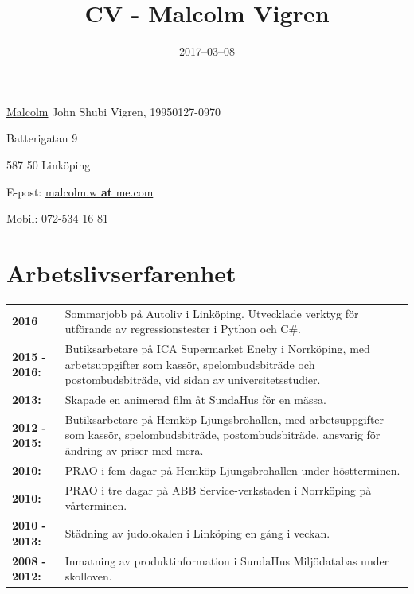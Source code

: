 \documentclass[a4paper,notitlepage]{article}
\title{
\huge{CV - Malcolm Vigren}\vspace{-3ex}}
\date{2017--03--08}
\begin{document}
	\maketitle
\underline{Malcolm} John Shubi Vigren, 19950127-0970

Batterigatan 9

587 50 Linköping

E-post: \underline{malcolm.w \textbf{at} me.com}

Mobil: 072-534 16 81

\section*{Arbetslivserfarenhet}
\noindent\begin{tabular}{@{}l p{13cm}}

\textbf{2016} & Sommarjobb på Autoliv i Linköping. Utvecklade verktyg för
    utförande av regressionstester i Python och C\#.\\

\textbf{2015 - 2016:} & Butiksarbetare på ICA Supermarket Eneby i Norrköping, med
arbetsuppgifter som kassör, spelombudsbiträde och postombudsbiträde, vid sidan
av universitetsstudier. \\

\textbf{2013:} & Skapade en animerad film åt SundaHus för en mässa.
\\

\textbf{2012 - 2015:} & Butiksarbetare på Hemköp Ljungsbrohallen,
med arbetsuppgifter
som kassör,
spelombudsbiträde, postombudsbiträde, ansvarig för ändring av priser med mera.
\\

\textbf{2010:} & PRAO i fem dagar på Hemköp Ljungsbrohallen under
höstterminen. \\

\textbf{2010:} & PRAO i tre dagar på ABB Service-verkstaden i
Norrköping på vårterminen. \\

\textbf{2010 - 2013:} & Städning av judolokalen i Linköping en gång
i veckan. \\

\textbf{2008 - 2012:} & Inmatning av produktinformation i SundaHus Miljödatabas under
skolloven.	\\

	\end{tabular}
\end{document}
